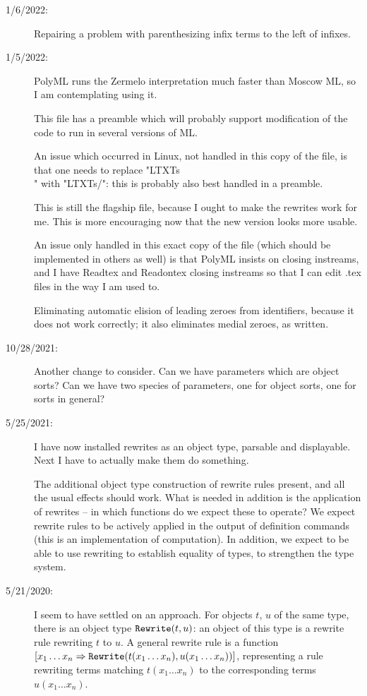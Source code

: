 \documentclass[12pt]{article}
\begin{document}
\begin{description}
\item[1/6/2022:]  Repairing a problem with parenthesizing infix terms to the left of infixes.

\item[1/5/2022:]  PolyML runs the Zermelo interpretation much faster than Moscow ML, so I am contemplating using it.

This file has a preamble which will probably support modification of the code to run in several versions of ML.

An issue which occurred in Linux, not handled in this copy of the file, is that one needs to replace "LTXTs\\" with
"LTXTs/":  this is probably also best handled in a preamble.

This is still the flagship file, because I ought to make the rewrites work for me.  This is more encouraging now that
the new version looks more usable.

An issue only handled in this exact copy of the file (which should be implemented in others as well) is that
PolyML insists on closing instreams, and I have Readtex and Readontex closing instreams so that I can edit .tex
files in the way I am used to.

Eliminating automatic elision of leading zeroes from identifiers, because it does not work correctly;
it also eliminates medial zeroes, as written.

\item[10/28/2021:]  Another change to consider.  Can we have parameters which are object sorts?  Can we have
two species of parameters, one for object sorts, one for sorts in general?

\item[5/25/2021:]  I have now installed rewrites as an object type, parsable and displayable.  Next I have to actually make them do something.

The additional object type construction of rewrite rules present, and all the usual effects should work.  What is needed in addition is the application of rewrites -- in which functions
do we expect these to operate?  We expect rewrite rules to be actively applied in the output of definition commands (this is an implementation of computation).
In addition, we expect to be able to use rewriting to establish equality of types, to strengthen the type system.

\item[5/21/2020:]  I seem to have settled on an approach.  For objects $t$, $u$ of the same type, there is an object type ${\tt Rewrite}(t,u)$:  an object of this
type is a rewrite rule rewriting $t$ to $u$.  A general rewrite rule is a function $[x_1 \ldots x_n \Rightarrow {\tt Rewrite}(t(x_1\ldots x_n),u(x_1\ldots x_n))]$, representing
a rule rewriting terms matching $t(x_1\ldots x_n)$ to the corresponding terms $u(x_1\ldots x_n)$.


\end{description}
\end{document}
